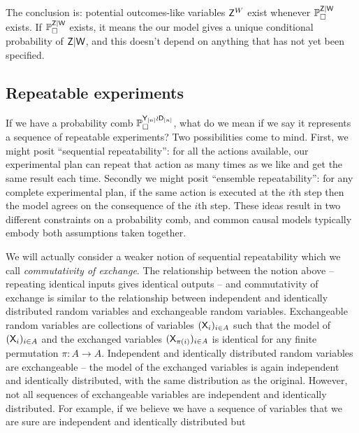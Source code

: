 The conclusion is: potential outcomes-like variables $\mathsf{Z}^W$ exist whenever $\mathbb{P}_\square^{\mathsf{Z}|\mathsf{W}}$ exists. If $\mathbb{P}_\square^{\mathsf{Z}|\mathsf{W}}$ exists, it means the our model gives a unique conditional probability of $\mathsf{Z}|\mathsf{W}$, and this doesn't depend on anything that has not yet been specified.

\subsection{Repeatable experiments}

If we have a probability comb $\mathbb{P}_\square^{\mathsf{Y}_{[n]}\wr \mathsf{D}_{[n]}}$, what do we mean if we say it represents a sequence of repeatable experiments? Two possibilities come to mind. First, we might posit ``sequential repeatability'': for all the actions available, our experimental plan can repeat that action as many times as we like and get the same result each time. Secondly we might posit ``ensemble repeatability'': for any complete experimental plan, if the same action is executed at the $i$th step then the model agrees on the consequence of the $i$th step. These ideas result in two different constraints on a probability comb, and common causal models typically embody both assumptions taken together.

We will actually consider a weaker notion of sequential repeatability which we call \emph{commutativity of exchange}. The relationship between the notion above -- repeating identical inputs gives identical outputs -- and commutativity of exchange is similar to the relationship between independent and identically distributed random variables and exchangeable random variables. Exchangeable random variables are collections of variables $(\mathsf{X}_i)_{i\in A}$ such that the model of  $(\mathsf{X}_i)_{i\in A}$ and the exchanged variables $(\mathsf{X}_{\pi(i)})_{i\in A}$ is identical for any finite permutation $\pi:A\to A$. Independent and identically distributed random variables are exchangeable -- the model of the exchanged variables is again independent and identically distributed, with the same distribution as the original. However, not all sequences of exchangeable variables are independent and identically distributed. For example, if we believe we have a sequence of variables that we are sure are independent and identically distributed but 

